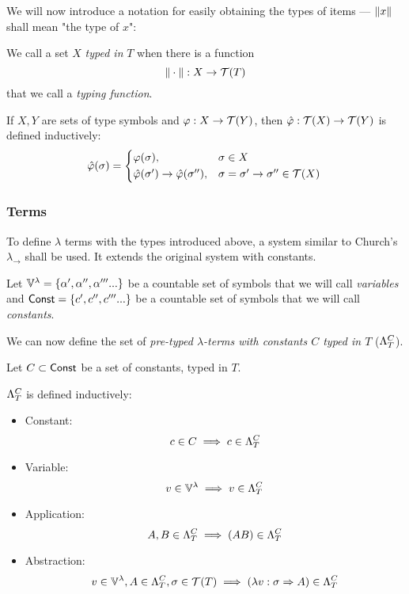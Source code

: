 \documentclass[main.tex]{subfiles}
\begin{document}
We will now introduce a notation for easily obtaining the types of items ---
$\typeof{x}$ shall mean "the type of $x$":

\begin{defn}
    We call a set $X$ \emph{typed in} $T$ when there is a function
    \[ \typeoff : X \rightarrow \tclos{T} \]
    that we call a \emph{typing function}.
\end{defn}

\begin{defn}
    If $X, Y$ are sets of type symbols and $\varphi: X \rightarrow \tclos{Y}$,
    then $\hat{\varphi} : \tclos{X} \rightarrow \tclos{Y}$ is defined inductively:
    \begin{equation*}
        \hat{\varphi}(\sigma) =
        \begin{cases*}
            \varphi(\sigma) ,& $\sigma \in X$ \\
            \hat{\varphi}(\sigma') \rightarrow \hat{\varphi}(\sigma'') ,&
                $\sigma = \sigma' \rightarrow \sigma'' \in \tclos{X}$ \\
        \end{cases*}
    \end{equation*}
\end{defn}

\subsubsection{Terms}
To define $\lambda$ terms with the types introduced above, a system similar
to Church's $\lambda_\rightarrow$ \cite[chap.~2.4]{ttfp} shall be used. It
extends the original system with constants.

Let $\lvars = \{ \alpha', \alpha'', \alpha''' ... \}$ be a countable set of symbols
that we will call \emph{variables} and $\const = \{ c', c'', c''' ... \}$ be a countable
set of symbols that we will call \emph{constants}.

We can now define the set of
\emph{pre-typed $\lambda$-terms with constants $C$ typed in $T$} ($\plambda{T}{C}$).

\begin{defn}
    \label{def:lambdaterm}
    Let $C \subset \const$ be a set of constants, typed in $T$.

    $\plambda{T}{C}$ is defined inductively:
    \begin{itemize}
        \item Constant:    \[ c \in C \implies c \in \plambda{T}{C} \]
        \item Variable:    \[ v \in \lvars \implies v \in \plambda{T}{C} \]
        \item Application: \[ A, B \in \plambda{T}{C} \implies (AB) \in \plambda{T}{C} \]
        \item Abstraction: \[ v \in \lvars, A \in \plambda{T}{C}, \sigma \in \tclos{T}
                \implies (\lambda v : \sigma \abstr A) \in \plambda{T}{C} \]
    \end{itemize}
\end{defn}
\end{document}
